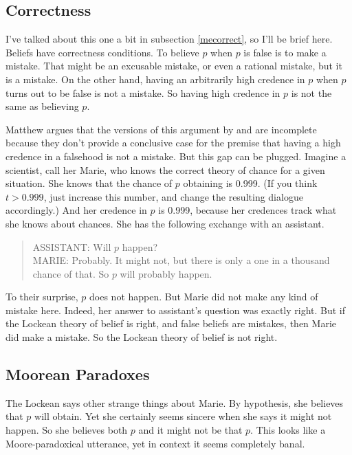 \documentclass[11pt,]{book}
\begin{document}
\hypertarget{lockecorrect}{%
\subsection{Correctness}\label{lockecorrect}}

I've talked about this one a bit in subsection \ref{mecorrect}, so I'll be brief here. Beliefs have correctness conditions. To believe \(p\) when \(p\) is false is to make a mistake. That might be an excusable mistake, or even a rational mistake, but it is a mistake. On the other hand, having an arbitrarily high credence in \(p\) when \(p\) turns out to be false is not a mistake. So having high credence in \(p\) is not the same as believing \(p\).

Matthew \citet{Lee2017a} argues that the versions of this argument by \citet{RossSchroeder2014} and \citet{FantlMcGrath2009} are incomplete because they don't provide a conclusive case for the premise that having a high credence in a falsehood is not a mistake. But this gap can be plugged. Imagine a scientist, call her Marie, who knows the correct theory of chance for a given situation. She knows that the chance of \(p\) obtaining is 0.999. (If you think \(t > 0.999\), just increase this number, and change the resulting dialogue accordingly.) And her credence in \(p\) is 0.999, because her credences track what she knows about chances. She has the following exchange with an assistant.

\begin{quote}
ASSISTANT: Will \(p\) happen?\\
MARIE: Probably. It might not, but there is only a one in a thousand chance of that. So \(p\) will probably happen.
\end{quote}

To their surprise, \(p\) does not happen. But Marie did not make any kind of mistake here. Indeed, her answer to assistant's question was exactly right. But if the Lockean theory of belief is right, and false beliefs are mistakes, then Marie did make a mistake. So the Lockean theory of belief is not right.

\hypertarget{lockemoore}{%
\subsection{Moorean Paradoxes}\label{lockemoore}}

The Lockean says other strange things about Marie. By hypothesis, she believes that \(p\) will obtain. Yet she certainly seems sincere when she says it might not happen. So she believes both \(p\) and it might not be that \(p\). This looks like a Moore-paradoxical utterance, yet in context it seems completely banal.
\end{document}
